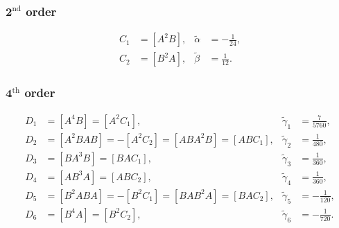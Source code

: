 \documentclass[12pt]{article}
\begin{document}
\subsubsection*{$\mathbf{2}^{\textrm{nd}}$ order}

\vspace{0.1cm}

\begin{equation}
  \begin{aligned}
    \nonumber
    C_{1} &= \left [ A^{2} B \right ], & \tilde{\alpha} &= - \frac{1}{24}, \\
    C_{2} &= \left [ B^{2} A \right ], & \tilde{\beta} &= \frac{1}{12}.
  \end{aligned}
\end{equation}

\vspace{0.1cm}

\subsubsection*{$\mathbf{4}^{\textrm{th}}$ order}

\vspace{0.1cm}

\begin{equation}
  \begin{aligned}
    \nonumber
    D_{1} &= \left [ A^{4} B \right ] = \left [ A^{2} C_{1} \right ],  & \tilde{\gamma}_{1} &= \frac{7}{5760}, \\
    D_{2} &= \left [ A^{2} B A B \right ] = - \left [ A^{2} C_{2} \right ] = \left [ A B A^{2} B \right ] = \left [ A B C_{1} \right ],  & \tilde{\gamma}_{2} &= \frac{1}{480}, \\
    D_{3} &= \left [ B A^{3} B \right ] = \left [ B A C_{1} \right ],  & \tilde{\gamma}_{3} &= \frac{1}{360}, \\
    D_{4} &= \left [ A B^{3} A \right ] = \left [ A B C_{2} \right ],  & \tilde{\gamma}_{4} &= \frac{1}{360}, \\
    D_{5} &= \left [ B^{2} A B A \right ] = - \left [ B^{2} C_{1} \right ] = \left [ B A B^{2} A \right ] = \left [ B A C_{2} \right ],  & \tilde{\gamma}_{5} &= - \frac{1}{120}, \\
    D_{6} &= \left [ B^{4} A \right ] = \left [ B^{2} C_{2} \right ],  & \tilde{\gamma}_{6} &= -\frac{1}{720}.
  \end{aligned}
\end{equation}

\vspace{0.1cm}
\end{document}
